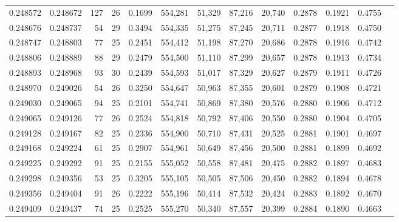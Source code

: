 \begin{tabular}{rrrrrrrrrrrrr}
0.248572 & 0.248672 & 127 &  26 &                                     0.1699 & 554,281 &  51,329 &  87,216 &  20,740 & 0.2878 & 0.1921 & 0.4755 \\
0.248676 & 0.248737 &  54 &  29 &                                     0.3494 & 554,335 &  51,275 &  87,245 &  20,711 & 0.2877 & 0.1918 & 0.4750 \\
0.248747 & 0.248803 &  77 &  25 &                                     0.2451 & 554,412 &  51,198 &  87,270 &  20,686 & 0.2878 & 0.1916 & 0.4742 \\
0.248806 & 0.248889 &  88 &  29 &                                     0.2479 & 554,500 &  51,110 &  87,299 &  20,657 & 0.2878 & 0.1913 & 0.4734 \\
0.248893 & 0.248968 &  93 &  30 &                                     0.2439 & 554,593 &  51,017 &  87,329 &  20,627 & 0.2879 & 0.1911 & 0.4726 \\
0.248970 & 0.249026 &  54 &  26 &                                     0.3250 & 554,647 &  50,963 &  87,355 &  20,601 & 0.2879 & 0.1908 & 0.4721 \\
0.249030 & 0.249065 &  94 &  25 &                                     0.2101 & 554,741 &  50,869 &  87,380 &  20,576 & 0.2880 & 0.1906 & 0.4712 \\
0.249065 & 0.249126 &  77 &  26 &                                     0.2524 & 554,818 &  50,792 &  87,406 &  20,550 & 0.2880 & 0.1904 & 0.4705 \\
0.249128 & 0.249167 &  82 &  25 &                                     0.2336 & 554,900 &  50,710 &  87,431 &  20,525 & 0.2881 & 0.1901 & 0.4697 \\
0.249168 & 0.249224 &  61 &  25 &                                     0.2907 & 554,961 &  50,649 &  87,456 &  20,500 & 0.2881 & 0.1899 & 0.4692 \\
0.249225 & 0.249292 &  91 &  25 &                                     0.2155 & 555,052 &  50,558 &  87,481 &  20,475 & 0.2882 & 0.1897 & 0.4683 \\
0.249298 & 0.249356 &  53 &  25 &                                     0.3205 & 555,105 &  50,505 &  87,506 &  20,450 & 0.2882 & 0.1894 & 0.4678 \\
0.249356 & 0.249404 &  91 &  26 &                                     0.2222 & 555,196 &  50,414 &  87,532 &  20,424 & 0.2883 & 0.1892 & 0.4670 \\
0.249409 & 0.249437 &  74 &  25 &                                     0.2525 & 555,270 &  50,340 &  87,557 &  20,399 & 0.2884 & 0.1890 & 0.4663 \\

\end{tabular}
